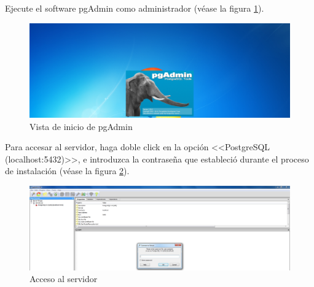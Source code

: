 Ejecute el software pgAdmin como administrador (v\'{e}ase la figura \ref{fig:pgadmin-inicio}).
\vfill
\begin{figure}[H]
  \centering
  \includegraphics[width=1\linewidth]{./img/pgadmin-inicio.jpg}
\caption[]{Vista de inicio de pgAdmin\label{fig:pgadmin-inicio}}
\end{figure}
\vfill
Para accesar al servidor, haga doble click en la opci\'{o}n <<PostgreSQL (localhost:5432)>>, e introduzca la contrase\~{n}a que estableci\'{o} durante el proceso de instalaci\'{o}n (v\'{e}ase la figura \ref{fig:pgadmin-acceso}).
\vfill
\begin{figure}[H]
  \centering
  \includegraphics[width=1\linewidth]{./img/pgadmin-acceso.jpg}
\caption[]{Acceso al servidor\label{fig:pgadmin-acceso}}
\end{figure}
\vfill
\newpage

